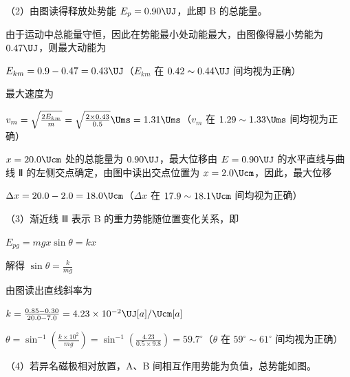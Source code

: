 \documentclass[\gkver]{gaokaozhenti}
\begin{document}
\begin{enumerate}
{（2）由图读得释放处势能 $E_{p} = 0.90\UJ$，此即 B 的总能量。

由于运动中总能量守恒，因此在势能最小处动能最大，由图像得最小势能为 $0.47\UJ$，则最大动能为

$E_{km} = 0.9 - 0.47 = 0.43\UJ$（$E_{km}$ 在 $0.42 \sim 0.44\UJ$ 间均视为正确）

最大速度为

$v_{m} = \sqrt{\frac{2E_{km}}{m}} = \sqrt{\frac{2 \times 0.43}{0.5}}\Ums = 1.31\Ums$（$v_{m}$ 在 $1.29 \sim 1.33\Ums$ 间均视为正确）

$x = 20.0\Ucm$ 处的总能量为 $0.90\UJ$，最大位移由 $E = 0.90\UJ$ 的水平直线与曲线 Ⅱ 的左侧交点确定，由图中读出交点位置为 $x = 2.0\Ucm$，因此，最大位移

$\Delta x = 20.0 - 2.0 = 18.0\Ucm$（$\Delta x$ 在 $17.9 \sim 18.1\Ucm$ 间均视为正确）

（3）渐近线 Ⅲ 表示 B 的重力势能随位置变化关系，即

$E_{pg} = mgx\sin\theta = kx$

解得 $\sin\theta = \frac{k}{mg}$

由图读出直线斜率为

$k = \frac{0.85 - 0.30}{20.0 - 7.0} = 4.23 \times 10^{-2}\UJ[a]/\Ucm[a]$

$\theta = \sin^{-1}\left(\frac{k \times 10^{2}}{mg}\right) = \sin^{-1}\left(\frac{4.23}{0.5 \times 9.8}\right) = 59.7^{\circ}$（$\theta$ 在 $59^{\circ} \sim 61^{\circ}$ 间均视为正确）

（4）若异名磁极相对放置，A、B 间相互作用势能为负值，总势能如图。

\onepicture[align=right, w=9.08cm]{}
}

\end{enumerate}
\end{document}
